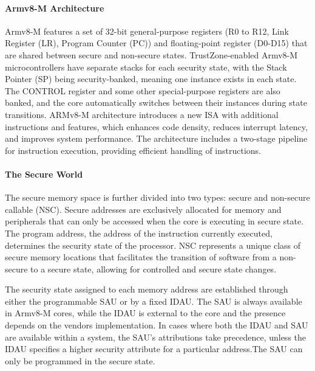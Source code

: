 \paragraph{\textbf{Armv8-M Architecture}}
%
Armv8-M features a set of 32-bit
general-purpose registers (R0 to R12, Link Register (LR), Program Counter
(PC)) and floating-point register (D0-D15) that are shared between secure
and non-secure states. TrustZone-enabled Armv8-M microcontrollers have
separate stacks for each security state, with the Stack Pointer (SP) being
security-banked, meaning one instance exists in each state. The CONTROL
register and some other special-purpose registers are also banked, and the
core automatically switches between their instances during state
transitions. ARMv8-M architecture introduces a new ISA with additional
instructions and features, which enhances code density, reduces interrupt
latency, and improves system performance. The architecture includes a
two-stage pipeline for instruction execution, providing efficient handling
of instructions.

\paragraph{\textbf{The Secure World}}
%
The secure memory space is further divided into two types: secure and
non-secure callable (\ac{NSC}). Secure addresses are exclusively allocated
for memory and peripherals that can only be accessed when the core is
executing in secure state. The program address, the address of the
instruction currently executed, determines the security state of the
processor.
\ac{NSC} represents a unique class of secure memory locations that
facilitates the transition of software from a non-secure to a secure state,
allowing for controlled and secure state changes. 

The security state assigned to each memory address are established through
either the programmable \ac{SAU} or by a fixed \ac{IDAU}. The \ac{SAU} is
always available in Armv8-M cores, while the \ac{IDAU} is external to the
core and the presence depends on the vendors implementation. In cases where
both the \ac{IDAU} and \ac{SAU} are available within a system, the
\ac{SAU}'s attributions take precedence, unless the \ac{IDAU} specifies a
higher security attribute for a particular address.The \ac{SAU} can only be
programmed in the secure state. 

